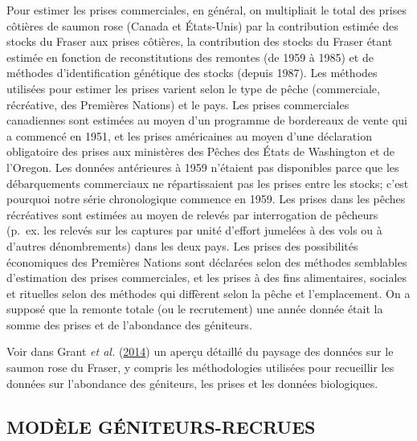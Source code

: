 \documentclass[french,11pt]{book}
\begin{document}
Pour estimer les prises commerciales, en général, on multipliait le total des prises côtières de saumon rose (Canada et États-Unis) par la contribution estimée des stocks du Fraser aux prises côtières, la contribution des stocks du Fraser étant estimée en fonction de reconstitutions des remontes (de 1959 à 1985) et de méthodes d'identification génétique des stocks (depuis 1987). Les méthodes utilisées pour estimer les prises varient selon le type de pêche (commerciale, récréative, des Premières Nations) et le pays. Les prises commerciales canadiennes sont estimées au moyen d'un programme de bordereaux de vente qui a commencé en 1951, et les prises américaines au moyen d'une déclaration obligatoire des prises aux ministères des Pêches des États de Washington et de l'Oregon. Les données antérieures à 1959 n'étaient pas disponibles parce que les débarquements commerciaux ne répartissaient pas les prises entre les stocks; c'est pourquoi notre série chronologique commence en 1959. Les prises dans les pêches récréatives sont estimées au moyen de relevés par interrogation de pêcheurs (p.~ex. les relevés sur les captures par unité d'effort jumelées à des vols ou à d'autres dénombrements) dans les deux pays. Les prises des possibilités économiques des Premières Nations sont déclarées selon des méthodes semblables d'estimation des prises commerciales, et les prises à des fins alimentaires, sociales et rituelles selon des méthodes qui diffèrent selon la pêche et l'emplacement. On a supposé que la remonte totale (ou le recrutement) une année donnée était la somme des prises et de l'abondance des géniteurs.

Voir dans Grant \emph{et al.} (\protect\hyperlink{ref-grantFraserRiverPink2014}{2014}) un aperçu détaillé du paysage des données sur le saumon rose du Fraser, y compris les méthodologies utilisées pour recueillir les données sur l'abondance des géniteurs, les prises et les données biologiques.

\hypertarget{moduxe8le-guxe9niteurs-recrues}{%
\subsection{MODÈLE GÉNITEURS-RECRUES}\label{moduxe8le-guxe9niteurs-recrues}}
\end{document}
